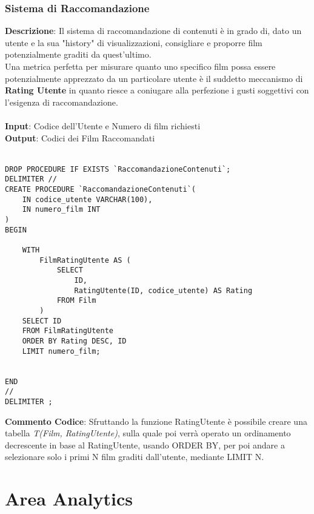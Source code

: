 \documentclass{article}
\begin{document}
\subsubsection{Sistema di Raccomandazione}
\textbf{Descrizione}: Il sistema di raccomandazione di contenuti è in grado di, dato un utente e la sua "history" di visualizzazioni, consigliare e proporre film potenzialmente graditi da quest'ultimo. \\ 
Una metrica perfetta per misurare quanto uno specifico film possa essere potenzialmente apprezzato da un particolare utente è il suddetto meccanismo di \textbf{Rating Utente} in quanto riesce a coniugare alla perfezione i gusti soggettivi con l'esigenza di raccomandazione. \\ \\ 
\textbf{Input}: Codice dell'Utente e Numero di film richiesti \\
\textbf{Output}: Codici dei Film Raccomandati \\ \\ 
\begin{lstlisting}
DROP PROCEDURE IF EXISTS `RaccomandazioneContenuti`;
DELIMITER //
CREATE PROCEDURE `RaccomandazioneContenuti`(
    IN codice_utente VARCHAR(100),
    IN numero_film INT
)
BEGIN

    WITH
        FilmRatingUtente AS (
            SELECT
                ID,
                RatingUtente(ID, codice_utente) AS Rating
            FROM Film
        )
    SELECT ID
    FROM FilmRatingUtente
    ORDER BY Rating DESC, ID
    LIMIT numero_film;


END
//
DELIMITER ;
\end{lstlisting}
\textbf{Commento Codice}: 
Sfruttando la funzione RatingUtente è possibile creare una tabella \textit{T(Film, RatingUtente)}, sulla quale poi verrà operato un ordinamento decrescente in base al RatingUtente, usando ORDER BY, per poi andare a selezionare solo i primi N film graditi dall'utente, mediante LIMIT N. 

\section{Area Analytics}
\end{document}
